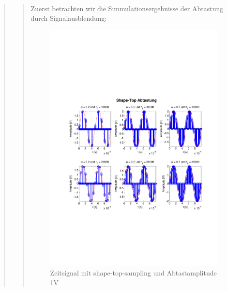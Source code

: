 \begin{quote}
\begin{quote}
    	Zuerst betrachten wir die Simmulationsergebnisse der Abtastung durch
    	Signalausblendung:
    	
    	 \begin{figure}[H]
    \centering
        \includegraphics[scale=0.7, trim = 0cm 0cm 0cm 0cm,
        clip]{./Bilder/shape-top-zeit_1V}
            \caption{Zeitsignal mit shape-top-sampling und Abtastamplitude 1V}
  	    \end{figure}
  	    

\end{quote}
\end{quote}
